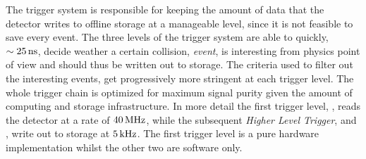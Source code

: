 The trigger system is responsible for keeping the amount of data that the detector writes to offline storage
at a manageable level, since it is not feasible to save every event. The three levels of the \lhcb trigger system
are able to quickly, $\sim 25{\rm \,ns}$, decide weather a certain collision, {\it event}, is interesting from physics point
of view and should thus be written out to storage. The criteria used to filter out the interesting events, get
progressively more stringent at each trigger level. The whole trigger chain is optimized for maximum
signal purity given the amount of computing and storage infrastructure. In more detail the first trigger
level, \lzero, reads the detector at a rate of $40{\rm \,MHz}$, while the subsequent {\it Higher Level Trigger},
\hltone and \hlttwo, write out to storage at $5{\rm \,kHz}$. The first trigger level is a pure hardware
implementation whilst the other two are software only.

